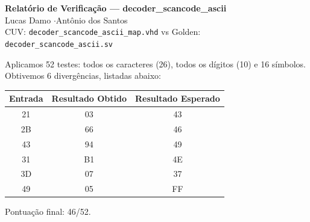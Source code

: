 \documentclass[a4paper,11pt]{article}
\begin{document}
\begin{center}
    {\large\bfseries Relatório de Verificação --- decoder\_scancode\_ascii}\\[4pt]
    Lucas Damo \quad$\cdot$\quad Antônio dos Santos\\[4pt]
    CUV: \texttt{decoder\_scancode\_ascii\_map.vhd} \quad vs \quad Golden: \texttt{decoder\_scancode\_ascii.sv}
\end{center}

\noindent

Aplicamos 52 testes: todos os caracteres (26), todos os dígitos (10) e 16 símbolos. Obtivemos 6 divergências, listadas abaixo:

\vspace{8pt}

\begin{center}
    \begin{tabular}{|c|c|c|}
    \hline
    \textbf{Entrada}  & \textbf{Resultado Obtido} & \textbf{Resultado Esperado} \\
    \hline
    21                & 03                        & 43  \\ 
    \hline
    2B                & 66                        & 46  \\ 
    \hline
    43                & 94                        & 49  \\ 
    \hline
    31                & B1                        & 4E  \\ 
    \hline
    3D                & 07                        & 37  \\ 
    \hline
    49                & 05                        & FF  \\ 
    \hline
    \end{tabular}
\end{center}

Pontuação final: 46/52.

\vspace{4pt}
\noindent
\end{document}
